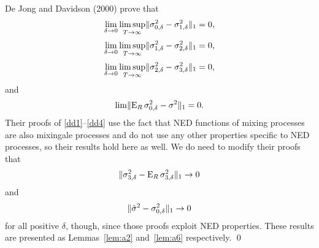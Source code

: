 \documentclass[12pt]{article}
\begin{document}
De Jong and Davidson (2000) prove that
\begin{equation} \label{dd1}
\lim_{\delta\to0} \limsup_{T\to\infty} \lVert \sigma_{0,\delta}^2 -
\sigma_{1,\delta}^2\rVert_1 = 0,
\end{equation}
\begin{equation} \label{dd2}
\lim_{\delta\to0} \limsup_{T\to\infty} \lVert \sigma_{1,\delta}^2 - \sigma_{2,\delta}^{2}
\rVert_1 = 0,
\end{equation}
\begin{equation} \label{dd3}
\lim_{\delta\to0} \limsup_{T\to\infty} \lVert \sigma_{2,\delta}^{2} - \sigma_{3,\delta}^{2}
\rVert_1 = 0,
\end{equation}
and
\begin{equation} \label{dd4}
\lim \lVert \operatorname{E}_R \sigma_{0,\delta}^2 - \sigma^2 \rVert_1 = 0.
\end{equation}
Their proofs of \eqref{dd1}--\eqref{dd4} use the fact that NED
functions of mixing processes are also mixingale processes and do not
use any other properties specific to NED processes, so their results
hold here as well.  We do need to modify their proofs that
\begin{equation}\label{eq:5}
  \lVert \sigma_{3,\delta}^{2} - \operatorname{E}_R \sigma_{3,\delta}^{2} \rVert_1 \to 0
\end{equation}
and
\begin{equation}\label{eq:4}
  \lVert \hat{\sigma}^2 - \sigma_{0,\delta}^2 \rVert_1 \to 0
\end{equation}
for all positive $\delta$, though, since those proofs exploit NED
properties. These results are presented as Lemmas~\ref{lem:a2}
and~\ref{lem:a6} respectively.  \qed
\end{document}
